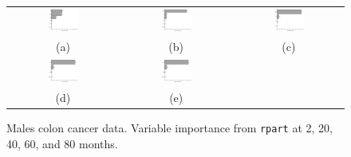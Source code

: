 \documentclass[12pt]{article}
\begin{document}
\begin{figure}[h!]
\centering
\begin{tabular}{c c c}
\includegraphics[width=0.3\textwidth]{rpartvimp1_males.pdf} & 
\includegraphics[width=0.3\textwidth]{rpartvimp10_males.pdf} & 
\includegraphics[width=0.3\textwidth]{rpartvimp20_males.pdf}\\
 (a) & (b) & (c) \\
 \includegraphics[width=0.3\textwidth]{rpartvimp30_males.pdf} & 
\includegraphics[width=0.3\textwidth]{rpartvimp40_males.pdf} & 
\\
 (d) & (e) & 
 \end{tabular}
\caption{ Males colon cancer data. Variable importance from \texttt{rpart} at 2, 20, 40, 60, and 80 months.}
\label{fig:rpartvimp_males}
\end{figure}

\pagebreak
\end{document}
